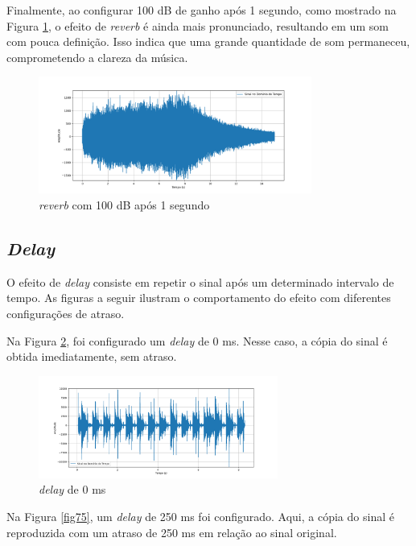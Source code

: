 Finalmente, ao configurar 100 dB de ganho após 1 segundo, como mostrado na Figura \ref{fig73}, o efeito de \textit{reverb} é ainda mais pronunciado, resultando em um som com pouca definição. Isso indica que uma grande quantidade de som permaneceu, comprometendo a clareza da música.

\begin{figure}[h]
    \centering
    \includegraphics[width=0.8\textwidth]{figuras/fig73.png}
    \caption{\textit{reverb} com 100 dB após 1 segundo}
    \label{fig73}
\end{figure}

\subsection{\textit{Delay}}

O efeito de \textit{delay} consiste em repetir o sinal após um determinado intervalo de tempo. As figuras a seguir ilustram o comportamento do efeito com diferentes configurações de atraso.

Na Figura \ref{fig74}, foi configurado um \textit{delay} de 0 ms. Nesse caso, a cópia do sinal é obtida imediatamente, sem atraso.

\begin{figure}[h]
	\centering
    \includegraphics[width=0.7\textwidth]{figuras/fig74.png}
	\caption{\textit{delay} de 0 ms}
	\label{fig74}
\end{figure}

Na Figura \ref{fig75}, um \textit{delay} de 250 ms foi configurado. Aqui, a cópia do sinal é reproduzida com um atraso de 250 ms em relação ao sinal original.

